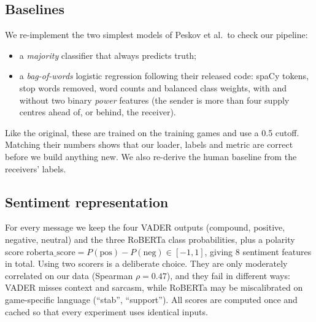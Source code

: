 \documentclass[conference]{IEEEtran}
\begin{document}
\subsection{Baselines}
We re-implement the two simplest models of Peskov et al.\ to check our pipeline:
\begin{itemize}
\item a \emph{majority} classifier that always predicts truth;
\item a \emph{bag-of-words} logistic regression following their released code: spaCy tokens, stop words removed, word counts and balanced class weights, with and without two binary \emph{power} features (the sender is more than four supply centres ahead of, or behind, the receiver).
\end{itemize}
Like the original, these are trained on the training games and use a 0.5 cutoff. Matching their numbers shows that our loader, labels and metric are correct before we build anything new. We also re-derive the human baseline from the receivers' labels.

\subsection{Sentiment representation}
For every message we keep the four VADER outputs (compound, positive, negative, neutral) and the three RoBERTa class probabilities, plus a polarity score $\text{roberta\_score} = P(\text{pos}) - P(\text{neg}) \in [-1,1]$, giving 8 sentiment features in total. Using two scorers is a deliberate choice. They are only moderately correlated on our data (Spearman $\rho = 0.47$), and they fail in different ways: VADER misses context and sarcasm, while RoBERTa may be miscalibrated on game-specific language (``stab'', ``support''). All scores are computed once and cached so that every experiment uses identical inputs.
\end{document}
